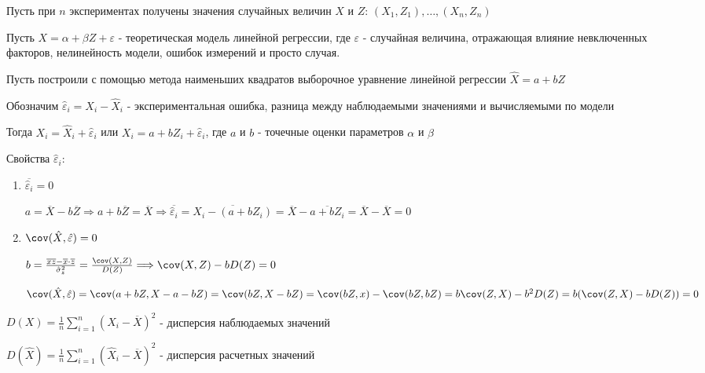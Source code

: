 \documentclass[12pt]{article}
\begin{document}
\begin{enumerate}
    Пусть при $n$ экспериментах получены значения случайных величин $X$ и $Z$: $(X_1, Z_1), \dots, (X_n, Z_n)$

    Пусть $X = \alpha + \beta Z + \varepsilon$ - теоретическая модель линейной регрессии, где $\varepsilon$ - случайная величина,
    отражающая влияние невключенных факторов, нелинейность модели, ошибок измерений и просто случая.

    Пусть построили с помощью метода наименьших квадратов выборочное уравнение линейной регрессии $\hat X = a + b Z$

    Обозначим $\hat \varepsilon_i = X_i - \hat X_i$ - экспериментальная ошибка, разница между наблюдаемыми значениями и 
    вычисляемыми по модели

    Тогда $X_i = \hat X_i + \hat \varepsilon_i$ или $X_i = a + b Z_i + \hat \varepsilon_i$, где $a$ и $b$ - точечные оценки параметров $\alpha$ и $\beta$

    Свойства $\hat \varepsilon_i$:

    \begin{enumerate}
        \item $\overline{\hat \varepsilon_i} = 0$

        \begin{MyProof}
            $a = \overline{X} - b \overline{Z} \Longrightarrow a + b \overline{Z} = \overline{X} \Longrightarrow \overline{\hat \varepsilon_i} = \overline{X_i - (a + b Z_i)} = \overline{X} - \overline{a + b Z_i} = \overline{X} - \overline{X} = 0$
        \end{MyProof}

        \item $\cov (\hat X, \hat \varepsilon) = 0$

        \begin{MyProof}
            $b = \frac{\overline{xz} - \overline{x} \cdot \overline{z}}{\hat \sigma^2_z} = \frac{\cov (X, Z)}{D(Z)} \Longrightarrow \cov (X, Z) - b D(Z) = 0$

            $\cov (\hat X, \hat \varepsilon) = \cov (a + b Z, X - a - bZ) = \cov (bZ, X - bZ) = \cov (bZ, x) - \cov (bZ, bZ) = b \cov (Z, X) - b^2 D(Z) = b (\cov (Z, X) - b D(Z)) = 0$
        \end{MyProof}
    \end{enumerate}

    \Def $D(X) = \frac{1}{n} \sum_{i = 1}^n (X_i - \overline{X})^2$ - дисперсия наблюдаемых значений

    \Defs $D(\hat X) = \frac{1}{n} \sum_{i = 1}^n (\hat X_i - \overline{X})^2$ - дисперсия расчетных значений


\end{enumerate}
\end{document}
